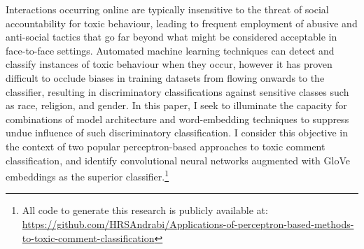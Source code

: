 Interactions occurring online are typically insensitive to the threat of social accountability for toxic behaviour, leading to frequent employment of abusive and anti-social tactics that go far beyond what might be considered acceptable in face-to-face settings. 
Automated machine learning techniques can detect and classify instances of toxic behaviour when they occur, however it has proven difficult to occlude biases in training datasets from flowing onwards to the classifier, resulting in discriminatory classifications against sensitive classes such as race, religion, and gender. 
In this paper, I seek to illuminate the capacity for combinations of model architecture and word-embedding techniques to suppress undue influence of such discriminatory classification.
I consider this objective in the context of two popular perceptron-based approaches to toxic comment classification, and identify convolutional neural networks augmented with GloVe embeddings as the superior classifier.\footnote{All code to generate this research is publicly available at: \url{https://github.com/HRSAndrabi/Applications-of-perceptron-based-methods-to-toxic-comment-classification}}

